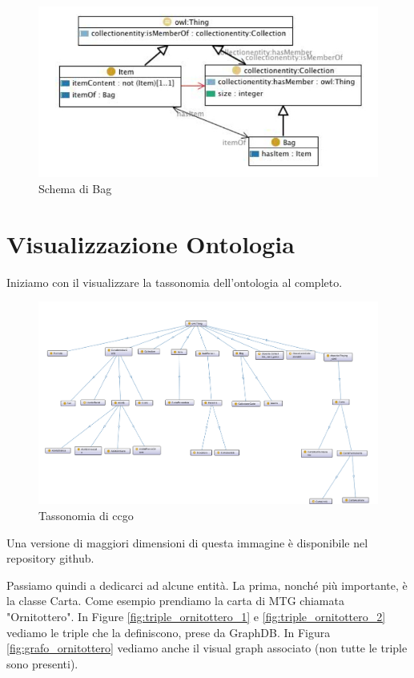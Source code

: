 \documentclass[12pt]{article}
\begin{document}
\begin{figure}[H]
    \includegraphics[width=14cm]{files/bag.png}
    \caption{Schema di Bag}
    \label{fig:bag}
\end{figure}

\newpage
\section{Visualizzazione Ontologia}

Iniziamo con il visualizzare la tassonomia dell'ontologia al completo.

\begin{figure}[H]
    \includegraphics[width=14cm]{files/tassonomia.png}
    \caption{Tassonomia di ccgo}
    \label{fig:tassonomia}
\end{figure}

Una versione di maggiori dimensioni di questa immagine è disponibile nel repository github.

Passiamo quindi a dedicarci ad alcune entità.
La prima, nonché più importante, è la classe Carta. Come esempio prendiamo la carta di MTG chiamata "Ornitottero". In Figure \ref{fig:triple_ornitottero_1} e \ref{fig:triple_ornitottero_2} vediamo le triple che la definiscono, prese da GraphDB. In Figura \ref{fig:grafo_ornitottero} vediamo anche il visual graph associato (non tutte le triple sono presenti).
\end{document}
